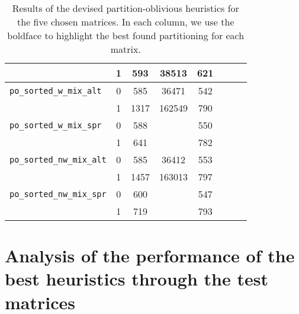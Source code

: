 \begin{table}[h]
\begin{tabular}{|l|c||c|c|c|c|c||c|}
 & 1 & 593 & 38513 & 621 \\ \hline
\verb|po_sorted_w_mix_alt| & 0 & 585 & 36471 & 542 \\ %
 & 1 & 1317 & 162549 & 790 \\ \hline
\verb|po_sorted_w_mix_spr| & 0 & 588 & & 550 \\ %
 & 1 & 641 & & 782 \\ \hline
\verb|po_sorted_nw_mix_alt| & 0 & 585 & 36412 & 553 \\ %
 & 1 & 1457 & 163013 & 797 \\ \hline
\verb|po_sorted_nw_mix_spr| & 0 & 600 & & 547 \\ %
 & 1 & 719 & & 793 \\ \hline
\end{tabular}
\caption{Results of the devised partition-oblivious heuristics for the five chosen matrices. In each column, we use the boldface to highlight the best found partitioning for each matrix. } \label{tab:preliminary_po}
\end{table}


\section{Analysis of the performance of the best heuristics through the test matrices}



